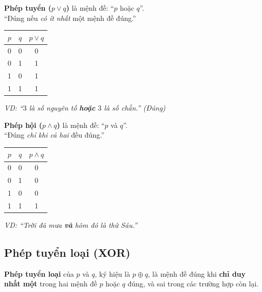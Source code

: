 \documentclass[12pt,a4paper]{article}
\begin{document}
\noindent
\begin{minipage}[t]{0.48\textwidth}
\textbf{Phép tuyển ($p \lor q$)} là mệnh đề: ``$p$ hoặc $q$''.\\
``Đúng nếu \textit{có ít nhất} một mệnh đề đúng.''

\begin{center}
\renewcommand{\arraystretch}{1.2}
\begin{tabular}{|c|c|c|}
\hline
$p$ & $q$ & $p \lor q$ \\ \hline
0 & 0 & 0 \\ \hline
0 & 1 & 1 \\ \hline
1 & 0 & 1 \\ \hline
1 & 1 & 1 \\ \hline
\end{tabular}
\end{center}

\textit{VD: ``$3$ là số nguyên tố \textbf{hoặc} $3$ là số chẵn.'' (Đúng)}
\end{minipage}
\hfill
\begin{minipage}[t]{0.48\textwidth}
\textbf{Phép hội ($p \land q$)} là mệnh đề: ``$p$ và $q$''.\\
``Đúng \textit{chỉ khi cả hai} đều đúng.''

\begin{center}
\renewcommand{\arraystretch}{1.2}
\begin{tabular}{|c|c|c|}
\hline
$p$ & $q$ & $p \land q$ \\ \hline
0 & 0 & 0 \\ \hline
0 & 1 & 0 \\ \hline
1 & 0 & 0 \\ \hline
1 & 1 & 1 \\ \hline
\end{tabular}
\end{center}

\textit{VD: ``Trời đã mưa \textbf{và} hôm đó là thứ Sáu.''}
\end{minipage}

\subsection{Phép tuyển loại (XOR)}

\textbf{Phép tuyển loại} của $p$ và $q$, ký hiệu là $p \oplus q$, là mệnh đề đúng khi \textbf{chỉ duy nhất một} trong hai mệnh đề $p$ hoặc $q$ đúng, và sai trong các trường hợp còn lại.
\end{document}
